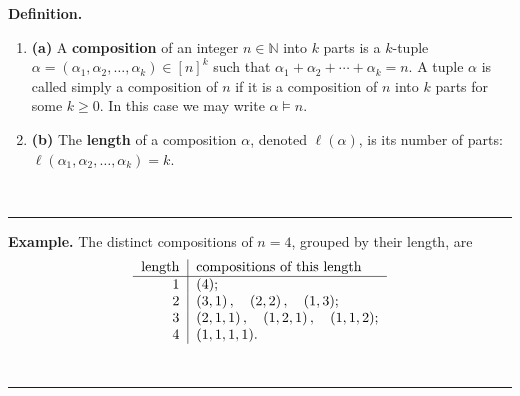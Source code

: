\documentclass[12pt]{article}
\theoremstyle{definition}%
\theoremstyle{definition}%
\newtheorem{defn}[thm]{Definition}
\newtheorem{exmp}[thm]{Example}
\theoremstyle{remark}%
\newcommand{\tup}[1]{\left( #1 \right)}
\newcommand{\interval}[1]{\left[ #1 \right]} %
\newcommand{\NN}{\mathbb{N}}
\newcommand{\defin}[1]{\textbf{#1}}
\newenvironment{defn}[1][Definition]{\noindent\textbf{#1.} }{\ \rule{0.5em}{0.5em}}
\newenvironment{exmp}[1][Example]{\noindent\textbf{#1.} }{\ \rule{0.5em}{0.5em}}
\begin{document}
\begin{defn}\ %
    \begin{enumerate}[]
        \item\textbf{(a)} A \defin{composition} of an integer $n \in \NN$ into $k$ parts is a $k$-tuple $\alpha = \tup{\alpha_1, \alpha_2, \dots, \alpha_k} \in \interval{n}^k$ such that $\alpha_1 + \alpha_2 + \cdots + \alpha_k = n$.
		A tuple $\alpha$ is called simply a composition of $n$ if it is a composition of $n$ into $k$ parts for some $k \geq 0$. In this case we may write $\alpha \models n$.
        \item\textbf{(b)} The \defin{length} of a composition $ \alpha $, denoted $ \ell\tup{ \alpha } $, is its number of parts: $ \ell\tup{ \alpha_1, \alpha_2, \dots, \alpha_k } = k $.
    \end{enumerate}
    
\end{defn}

\begin{exmp}
    The distinct compositions of $ n=4 $, grouped by their length, are
    \begin{align*}
        \begin{tabular}{r|l}
        \text{length} & \text{compositions of this length} \\ \hline
        $1$ & $\tup{ 4 }$; \\
        $2$ & $\tup{ 3,1 }, \quad \tup{ 2,2 }, \quad \tup{ 1,3 }$; \\
        $3$ & $\tup{ 2,1,1 }, \quad \tup{ 1,2,1 }, \quad \tup{ 1,1,2 } $; \\
        $4$ & $\tup{ 1,1,1,1 }$.
        \end{tabular}
    \end{align*}
\end{exmp}
\end{document}
